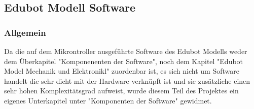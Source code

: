 \subsection{Edubot Modell Software}
\subsubsection{Allgemein}
Da die auf dem Mikrontroller ausgeführte Software des Edubot Modells weder dem Überkapitel "Komponenenten der Software", noch dem Kapitel "Edubot Model Mechanik und Elektronikl" zuordenbar ist, es sich nicht um Software handelt die sehr dicht mit der Hardware verknüpft ist und sie zusätzliche einen sehr hohen Komplexitätsgrad aufweist, wurde diesem Teil des Projektes ein eigenes Unterkapitel unter "Komponenten der Software" gewidmet.